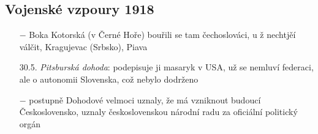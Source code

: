 \documentclass{article}
\begin{document}
\subsection*{Vojenské vzpoury 1918}
\begin{itemize}
    \vspace{-0.5em}
    \setlength\itemsep{0.15em}
    \item[$-$] Boka Kotorská (v Černé Hoře) bouřili se tam čechoslováci, u ž nechtjěí válčit, Kragujevac (Srbsko), Piava
    \item[30.5.] \textit{Pitsburská dohoda}: podepisuje ji masaryk v USA, už se nemluví federaci, ale o autonomii Slovenska, což nebylo dodrženo
    \item[$-$] postupně Dohodové velmoci uznaly, že má vzniknout budoucí Československo, uznaly československou národní radu za oficiální politický orgán
\end{itemize}
\end{document}
